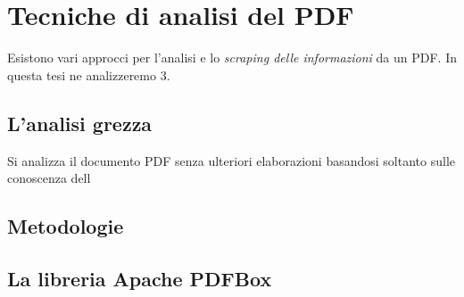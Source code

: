 \chapter{Tecniche di analisi del PDF}
Esistono vari approcci per l'analisi e lo \textit{scraping delle informazioni} da un PDF. In questa tesi ne analizzeremo 3.
\section{L'analisi grezza}
Si analizza il documento PDF senza ulteriori elaborazioni basandosi soltanto sulle conoscenza dell
\section{Metodologie}
\section{La libreria Apache PDFBox}
